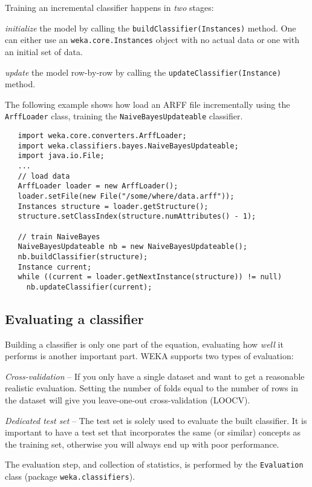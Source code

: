 Training an incremental classifier happens in \textit{two} stages:
\begin{tight_enumerate}
	\item \textit{initialize} the model by calling the
\texttt{buildClassifier(Instances)} method. One can either use an
\texttt{weka.core.Instances} object with no actual data or one with an initial
set of data.
	\item \textit{update} the model row-by-row by calling the
\texttt{updateClassifier(Instance)} method.
\end{tight_enumerate}
The following example shows how load an ARFF file incrementally using the
\texttt{ArffLoader} class, training the
\texttt{NaiveBayesUpdateable} classifier.
\begin{verbatim}
   import weka.core.converters.ArffLoader;
   import weka.classifiers.bayes.NaiveBayesUpdateable;
   import java.io.File;
   ...
   // load data
   ArffLoader loader = new ArffLoader();
   loader.setFile(new File("/some/where/data.arff"));
   Instances structure = loader.getStructure();
   structure.setClassIndex(structure.numAttributes() - 1);

   // train NaiveBayes
   NaiveBayesUpdateable nb = new NaiveBayesUpdateable();
   nb.buildClassifier(structure);
   Instance current;
   while ((current = loader.getNextInstance(structure)) != null)
     nb.updateClassifier(current);
\end{verbatim}

\newpage

\subsection{Evaluating a classifier}
Building a classifier is only one part of the equation, evaluating how
\textit{well} it performs is another important part. WEKA supports two types of
evaluation:
\begin{tight_itemize}
	\item \textit{Cross-validation} -- If you only have a single dataset and
want to get a reasonable realistic evaluation. Setting the number of folds equal
to the number of rows in the dataset will give you leave-one-out
cross-validation (LOOCV).
	\item \textit{Dedicated test set} -- The test set is solely used to evaluate
the built classifier. It is important to have a test set that incorporates the
same (or similar) concepts as the training set, otherwise you will always end
up with poor performance.
\end{tight_itemize}
The evaluation step, and collection of statistics, is performed by the
\texttt{Evaluation} class (package \texttt{weka.classifiers}).

